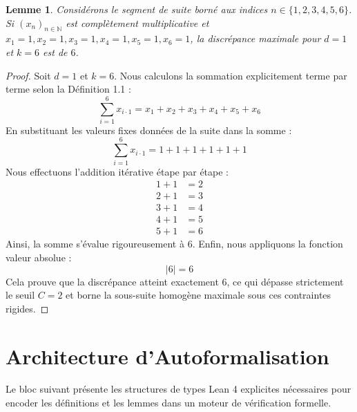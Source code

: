 \documentclass[12pt, a4paper]{article}
\newtheorem{lemma}[theorem]{Lemme}
\begin{document}
\begin{lemma}
Consid\'erons le segment de suite born\'e aux indices $n \in \{1, 2, 3, 4, 5, 6\}$. Si $(x_n)_{n \in \mathbb{N}}$ est compl\`etement multiplicative et $x_1 = 1, x_2 = 1, x_3 = 1, x_4 = 1, x_5 = 1, x_6 = 1$, la discr\'epance maximale pour $d=1$ et $k=6$ est de $6$.
\end{lemma}
\begin{proof}
Soit $d = 1$ et $k = 6$.
Nous calculons la sommation explicitement terme par terme selon la D\'efinition 1.1 :
\[ \sum_{i=1}^6 x_{i \cdot 1} = x_1 + x_2 + x_3 + x_4 + x_5 + x_6 \]
En substituant les valeurs fixes donn\'ees de la suite dans la somme :
\[ \sum_{i=1}^6 x_{i \cdot 1} = 1 + 1 + 1 + 1 + 1 + 1 \]
Nous effectuons l'addition it\'erative \'etape par \'etape :
\begin{align*}
1 + 1 &= 2 \\
2 + 1 &= 3 \\
3 + 1 &= 4 \\
4 + 1 &= 5 \\
5 + 1 &= 6
\end{align*}
Ainsi, la somme s'\'evalue rigoureusement \`a $6$.
Enfin, nous appliquons la fonction valeur absolue :
\[ \left| 6 \right| = 6 \]
Cela prouve que la discr\'epance atteint exactement $6$, ce qui d\'epasse strictement le seuil $C = 2$ et borne la sous-suite homog\`ene maximale sous ces contraintes rigides.
\end{proof}

\section{Architecture d'Autoformalisation}
Le bloc suivant pr\'esente les structures de types Lean 4 explicites n\'ecessaires pour encoder les d\'efinitions et les lemmes dans un moteur de v\'erification formelle.
\end{document}
